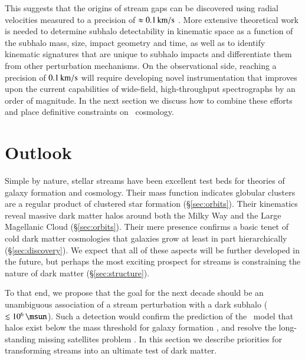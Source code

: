 \documentclass[final,5p,times,twocolumn,authoryear]{elsarticle}
\begin{document}
This  suggests that the origins of stream gaps can be discovered using radial velocities measured to a precision of $\approx0.1\,\unit{\kms}$ \citep[similar to forecasts in][]{li:2019b}.
More extensive theoretical work is needed to determine subhalo detectability in kinematic space as a function of the subhalo mass, size, impact geometry and time, as well as to identify kinematic signatures that are unique to subhalo impacts and differentiate them from other perturbation mechanisms.
On the observational side, reaching a precision of $0.1\,\unit{\kms}$ will require developing novel instrumentation that improves upon the current capabilities of wide-field, high-throughput spectrographs by an order of magnitude.
In the next section we discuss how to combine these efforts and place definitive constraints on \lcdm\ cosmology.


\section{Outlook}
\label{sec:outlook}

Simple by nature, stellar streams have been excellent test beds for theories of galaxy formation and cosmology.
Their mass function indicates globular clusters are a regular product of clustered star formation (\S\ref{sec:orbits}).
Their kinematics reveal massive dark matter halos around both the Milky Way and the Large Magellanic Cloud (\S\ref{sec:orbits}).
Their mere presence confirms a basic tenet of cold dark matter cosmologies that galaxies grow at least in part hierarchically (\S\ref{sec:discovery}).
We expect that all of these aspects will be further developed in the future, but perhaps the most exciting prospect for streams is constraining the nature of dark matter (\S\ref{sec:structure}).

To that end, we propose that the goal for the next decade should be an unambiguous association of a stream perturbation with a dark subhalo ($\lesssim10^6\,\unit{\msun}$).
Such a detection would confirm the prediction of the \lcdm\ model that halos exist below the mass threshold for galaxy formation \citep{bullock:2000, benson:2002, somerville:2002, benitez-llambay:2020}, and resolve the long-standing missing satellites problem \citep{klypin:1999,moore:1999}.
In this section we describe priorities for transforming streams into an ultimate  test of dark matter.
\end{document}
